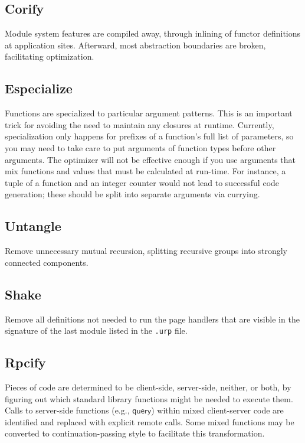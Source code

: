 \documentclass{article}
\newcommand{\mt}[1]{\mathsf{#1}}
\begin{document}
\subsection{Corify}

Module system features are compiled away, through inlining of functor definitions at application sites.  Afterward, most abstraction boundaries are broken, facilitating optimization.

\subsection{Especialize}

Functions are specialized to particular argument patterns.  This is an important trick for avoiding the need to maintain any closures at runtime.  Currently, specialization only happens for prefixes of a function's full list of parameters, so you may need to take care to put arguments of function types before other arguments.  The optimizer will not be effective enough if you use arguments that mix functions and values that must be calculated at run-time.  For instance, a tuple of a function and an integer counter would not lead to successful code generation; these should be split into separate arguments via currying.

\subsection{Untangle}

Remove unnecessary mutual recursion, splitting recursive groups into strongly connected components.

\subsection{Shake}

Remove all definitions not needed to run the page handlers that are visible in the signature of the last module listed in the \texttt{.urp} file.

\subsection{Rpcify}

Pieces of code are determined to be client-side, server-side, neither, or both, by figuring out which standard library functions might be needed to execute them.  Calls to server-side functions (e.g., $\mt{query}$) within mixed client-server code are identified and replaced with explicit remote calls.  Some mixed functions may be converted to continuation-passing style to facilitate this transformation.
\end{document}
